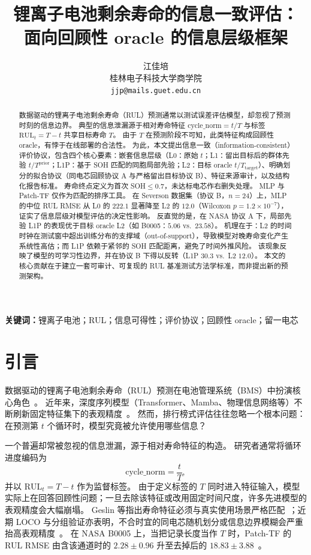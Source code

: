 \documentclass[UTF8,a4paper,12pt]{ctexart}
\title{锂离子电池剩余寿命的信息一致评估：\\
面向回顾性 oracle 的信息层级框架}
\author{江佳培\\
桂林电子科技大学商学院\\
\texttt{jjp@mails.guet.edu.cn}}
\date{}
\begin{document}
\maketitle

\begin{abstract}
\noindent
数据驱动的锂离子电池剩余寿命（RUL）预测通常以测试误差评估模型，却忽视了预测时刻的信息边界。
典型的信息泄漏源于相对寿命特征 $\mathrm{cycle\_norm}=t/T$ 与标签 $\mathrm{RUL}_t=T-t$ 共享目标寿命 $T$。
由于 $T$ 在预测阶段不可知，此类特征构成回顾性 oracle，有悖于在线部署的合法性。
为此，本文提出信息一致（information-consistent）评价协议，包含四个核心要素：嵌套信息层级（L0：原始 $t$；L1：留出目标后的群体先验 $t/T^{\mathrm{prior}}$；L1P：基于 SOH 匹配的同胞局部先验；L2：目标 oracle $t/T_{\mathrm{target}}$）、明确划分的拟合协议（同电芯回顾协议 A 与严格留出目标协议 B）、特征来源审计，以及结构化报告标准。
寿命终点定义为首次 SOH$\le 0.7$，未达标电芯作右删失处理。
MLP 与 Patch-TF 仅作为匹配的排序工具。
在 Severson 数据集（协议 B，$n{=}24$）上，MLP 的中位 RUL RMSE 从 L0 的 $222.1$ 显著降至 L2 的 $12.0$（Wilcoxon $p=1.2{\times}10^{-7}$），证实了信息层级对模型评估的决定性影响。
反直觉的是，在 NASA 协议 A 下，局部先验 L1P 的表现优于目标 oracle L2（如 B0005：$5.06$ vs.\ $23.58$）。
机理在于：L2 的时间时钟在测试窗中超出训练分布的支撑域（out-of-support），导致模型对晚寿命变化产生系统性高估；而 L1P 依赖于紧邻的 SOH 匹配距离，避免了时间外推风险。
该现象反映了模型的可学习性边界，并在协议 B 下得以反转（L1P $30.3$ vs.\ L2 $12.0$）。
本文的核心贡献在于建立一套可审计、可复现的 RUL 基准测试方法学标准，而非提出新的预测架构。
\end{abstract}

\noindent\textbf{关键词：}锂离子电池；RUL；信息可得性；评价协议；回顾性 oracle；留一电芯

\section{引言}
\label{sec:intro}

数据驱动的锂离子电池剩余寿命（RUL）预测在电池管理系统（BMS）中扮演核心角色~\cite{hu2019rser,xiong2018soh}。
近年来，深度序列模型（Transformer、Mamba、物理信息网络等）不断刷新固定特征集下的表观精度~\cite{lipu2018,wang2024gce,xu2025meas,yang2025batteries,zhang2025batlinet,deng2025piml,huang2025rulmamba,sun2026sgdits}。
然而，排行榜式评估往往忽略一个根本问题：在预测第 $t$ 个循环时，模型究竟被允许使用哪些信息？

一个普遍却常被忽视的信息泄漏，源于相对寿命特征的构造。
研究者通常将循环进度编码为
\begin{equation}
\mathrm{cycle\_norm}=\frac{t}{T},
\end{equation}
并以 $\mathrm{RUL}_t=T-t$ 作为监督标签。
由于定义标签的 $T$ 同时进入特征输入，模型实际上在回答回顾性问题；一旦去除该特征或改用固定时间尺度，许多先进模型的表观精度会大幅崩塌。
Geslin 等指出寿命特征必须与真实使用场景严格匹配~\cite{geslin2023joule}；近期 LOCO 与分组验证亦表明，不合时宜的同电芯随机划分或信息边界模糊会严重抬高表观精度~\cite{ali2026loco,barua2026predictor,madani2025groupkfold}。
在 NASA B0005 上，当把记录长度当作 $T$ 时，Patch-TF 的 RUL RMSE 由含该通道时的 $2.28\pm0.96$ 升至去掉后的 $18.83\pm3.88$~\cite{saha2007nasa}。
\end{document}
